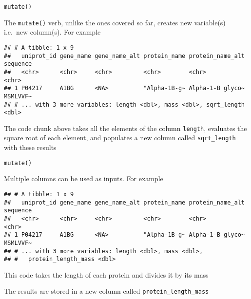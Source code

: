 \documentclass[ignorenonframetext,]{beamer}
\newenvironment{Shaded}{\begin{snugshade}}{\end{snugshade}}
\newcommand{\DataTypeTok}[1]{\textcolor[rgb]{0.13,0.29,0.53}{#1}}
\newcommand{\DecValTok}[1]{\textcolor[rgb]{0.00,0.00,0.81}{#1}}
\newcommand{\KeywordTok}[1]{\textcolor[rgb]{0.13,0.29,0.53}{\textbf{#1}}}
\newcommand{\NormalTok}[1]{#1}
\newcommand{\OperatorTok}[1]{\textcolor[rgb]{0.81,0.36,0.00}{\textbf{#1}}}
\newcommand{\StringTok}[1]{\textcolor[rgb]{0.31,0.60,0.02}{#1}}
\begin{document}
\begin{frame}[fragile]{\texttt{mutate()}}
\protect\hypertarget{mutate}{}

The \texttt{mutate()} verb, unlike the ones covered so far, creates new
variable(s) i.e.~new column(s). For example

\begin{Shaded}
\end{Shaded}

\begin{verbatim}
## # A tibble: 1 x 9
##   uniprot_id gene_name gene_name_alt protein_name protein_name_alt sequence
##   <chr>      <chr>     <chr>         <chr>        <chr>            <chr>   
## 1 P04217     A1BG      <NA>          "Alpha-1B-g~ Alpha-1-B glyco~ MSMLVVF~
## # ... with 3 more variables: length <dbl>, mass <dbl>, sqrt_length <dbl>
\end{verbatim}

The code chunk above takes all the elements of the column
\texttt{length}, evaluates the square root of each element, and
populates a new column called \texttt{sqrt\_length} with these results

\end{frame}

\begin{frame}[fragile]{\texttt{mutate()}}
\protect\hypertarget{mutate-1}{}

Multiple columns can be used as inputs. For example

\begin{Shaded}
\end{Shaded}

\begin{verbatim}
## # A tibble: 1 x 9
##   uniprot_id gene_name gene_name_alt protein_name protein_name_alt sequence
##   <chr>      <chr>     <chr>         <chr>        <chr>            <chr>   
## 1 P04217     A1BG      <NA>          "Alpha-1B-g~ Alpha-1-B glyco~ MSMLVVF~
## # ... with 3 more variables: length <dbl>, mass <dbl>,
## #   protein_length_mass <dbl>
\end{verbatim}

This code takes the length of each protein and divides it by its mass

The results are stored in a new column called
\texttt{protein\_length\_mass}

\end{frame}
\end{document}
